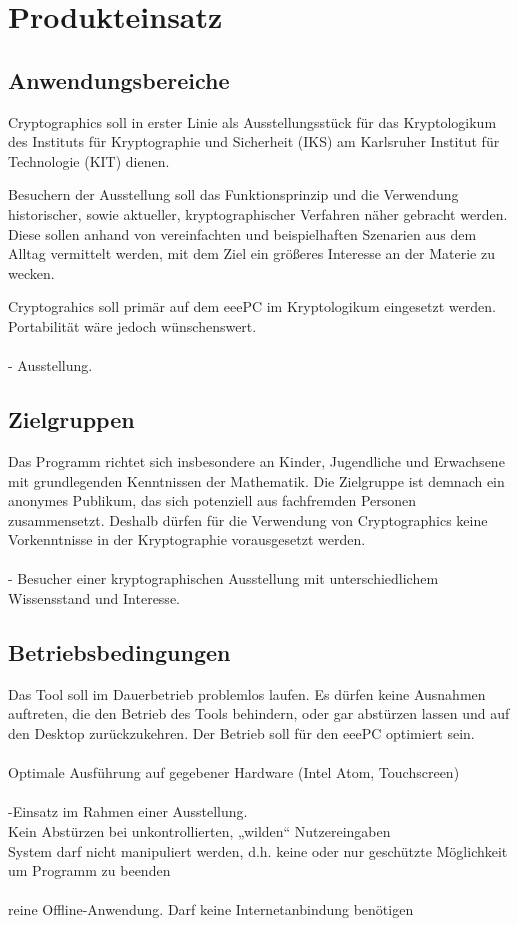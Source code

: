 \documentclass{article}
\begin{document}
\section{Produkteinsatz}
\subsection{Anwendungsbereiche}
Cryptographics soll in erster Linie als Ausstellungsstück für das Kryptologikum des Instituts für Kryptographie und Sicherheit (IKS) 
am Karlsruher Institut für Technologie (KIT) dienen. 

Besuchern der Ausstellung soll das Funktionsprinzip und die Verwendung historischer, 
sowie aktueller, kryptographischer Verfahren näher   gebracht werden. 
Diese sollen anhand von vereinfachten und beispielhaften Szenarien aus dem Alltag vermittelt werden, 
mit dem Ziel ein größeres Interesse an der Materie zu wecken.

Cryptograhics soll primär auf dem eeePC im Kryptologikum eingesetzt werden. Portabilität wäre jedoch wünschenswert.
\\ 
\\
- Ausstellung.

\subsection{Zielgruppen}
Das Programm richtet sich insbesondere an Kinder, Jugendliche und Erwachsene mit grundlegenden Kenntnissen der Mathematik. 
Die Zielgruppe ist demnach ein anonymes Publikum, das sich potenziell aus fachfremden Personen zusammensetzt. 
Deshalb dürfen für die Verwendung von Cryptographics keine Vorkenntnisse in der Kryptographie vorausgesetzt werden.
\\
\\
- Besucher einer kryptographischen Ausstellung mit unterschiedlichem Wissensstand und Interesse.

\subsection{Betriebsbedingungen}

Das Tool soll im Dauerbetrieb problemlos laufen. 
Es dürfen keine Ausnahmen auftreten, die den Betrieb des Tools behindern, 
oder gar abstürzen lassen und auf den Desktop zurückzukehren. 
Der Betrieb soll für den eeePC optimiert sein.
\\
\\
Optimale Ausführung auf gegebener Hardware (Intel Atom, Touchscreen)
\\
\\
-Einsatz im Rahmen einer Ausstellung.
\\
Kein Abstürzen bei unkontrollierten, „wilden“ Nutzereingaben
\\
System darf nicht manipuliert werden, d.h. keine oder nur geschützte
Möglichkeit um Programm zu beenden
\\
\\
reine Offline-Anwendung. Darf keine Internetanbindung benötigen
\end{document}
